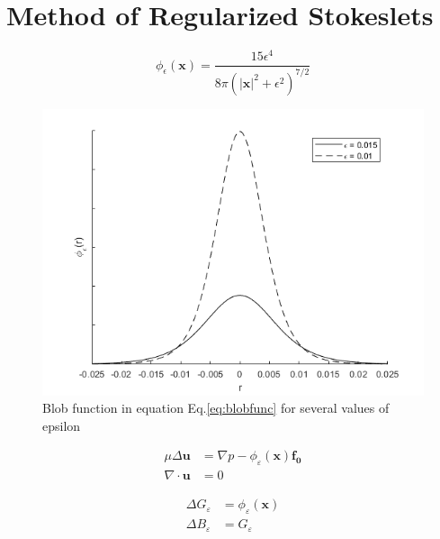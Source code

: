 \section{Method of Regularized Stokeslets}

\begin{equation}
\label{eq:blobfunc}
    \phi_\epsilon(\mathbf{x})= \frac{15 \epsilon^4}{8\pi\left( |\mathbf{x}|^2 +\epsilon^2 \right)^{7/2}}
\end{equation}

\begin{figure}[h]
    \centering
    \includegraphics[scale=0.65]{Images/BlobFunction.png}
    \caption{Blob function in equation Eq.\eqref{eq:blobfunc} for several values of epsilon}
    \label{fig:blobfunc}
\end{figure}

\begin{subequations}
\label{eq:RegStokesFlow}
\begin{align}
    \mu\Delta\boldsymbol{u} &= \nabla p - \phi_{\varepsilon}(\mathbf{x})\mathbf{f_0} \label{eq:RegStokesFlow1} \\ 
    \nabla \cdot \boldsymbol{u} &= 0 \label{eq:RegStokesFlow2}
\end{align}
\end{subequations}

\begin{subequations}
\label{eq:intermediate}
\begin{align}
    \Delta G_\varepsilon  &= \phi_\varepsilon(\mathbf{x}) \label{eq:inter1} \\
    \Delta B_\varepsilon  &= G_\varepsilon \label{eq:inter2}
\end{align}
\end{subequations}

